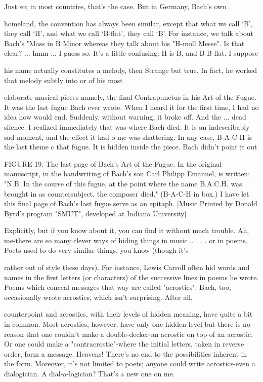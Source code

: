 \tortoise Just so; in most countries, that's the case. But in Germany, Bach’s own\par
homeland, the convention has always been similar, except that what we call `B', they call `H', and what we call `B-flat', they call `B'. For instance, we talk about Bach's "Mass in B Minor whereas they talk about his "H-moll Messe". Is that clear? 
\achilles ... hmm ... I guess so. It's a little confusing: H is B, and B B-flat. I suppose\par
his name actually constitutes a melody, then 
\tortoise Strange but true. In fact, he worked that melody subtly into or of his most\par
elaborate musical pieces-namely, the final Contrapunctus in his Art of the Fugue. It was the last fugue Bach ever wrote. When I heard it for the first time, I had no idea how would end. Suddenly, without warning, it broke off. And the ... dead silence. I realized immediately that was where Bach died. It is an indescribably sad moment, and the effect it had o me was-shattering. In any case, B-A-C-H is the last theme c that fugue. It is hidden inside the piece. Bach didn't point it out 







FIGURE 19. The last page of Bach's Art of the Fugue. In the original manuscript, in the handwriting of Bach's son Carl Philipp Emanuel, is written: "N.B. In the course of this fugue, at the point where the name B.A.C.H. was brought in as countersubject, the composer died." (B-A-C-H in box.) I have let this final page of Bach's last fugue serve as an epitaph. [Music Printed by Donald Byrd's program "SMUT", developed at Indiana University] 







Explicitly, but if you know about it, you can find it without much trouble. Ah, me-there are so many clever ways of hiding things in music .. . 
\achilles . . or in poems. Poets used to do very similar things, you know (though it's\par
rather out of style these days). For instance, Lewis Carroll often hid words and names in the first letters (or characters) of the successive lines in poems he wrote. Poems which conceal messages that way are called "acrostics". 
\tortoise Bach, too, occasionally wrote acrostics, which isn't surprising. After all,\par
counterpoint and acrostics, with their levels of hidden meaning, have quite a bit in common. Most acrostics, however, have only one hidden level-but there is no reason that one couldn't make a double-decker-an acrostic on top of an acrostic. Or one could make a "contracrostic"-where the initial letters, taken in reverse order, form a message. Heavens! There's no end to the possibilities inherent in the form. Moreover, it's not limited to poets; anyone could write acrostics-even a dialogician. 
\achilles A dial-a-logician? That's a new one on me.\par

